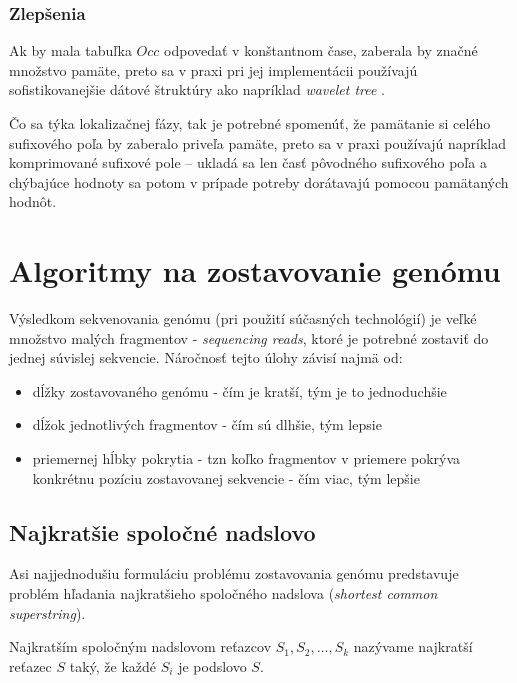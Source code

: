     \subsubsection{Zlepšenia}
    Ak by mala tabuľka $Occ$ odpovedať v konštantnom čase, zaberala by značné množstvo pamäte, preto sa v praxi pri jej implementácii používajú sofistikovanejšie dátové štruktúry ako napríklad \emph{wavelet tree} \cite{GGV03}.
    
    Čo sa týka lokalizačnej fázy, tak je potrebné spomenúť, že pamätanie si celého sufixového poľa by zaberalo priveľa pamäte, preto sa v praxi používajú napríklad komprimované sufixové pole -- ukladá sa len časť pôvodného sufixového poľa a chýbajúce hodnoty sa potom v prípade potreby dorátavajú pomocou pamätaných hodnôt.
    
    
\section{Algoritmy na zostavovanie genómu}
    Výsledkom sekvenovania genómu (pri použití súčasných technológií) je veľké
    množstvo malých fragmentov - \emph{sequencing reads}, ktoré je potrebné
    zostaviť do jednej súvislej sekvencie. Náročnosť tejto úlohy závisí najmä
    od:
    
    \begin{itemize}
        \item dĺžky zostavovaného genómu - čím je kratší, tým je to jednoduchšie
        \item dĺžok jednotlivých fragmentov - čím sú dlhšie, tým lepsie
        \item priemernej hĺbky pokrytia - tzn koľko fragmentov v priemere
        pokrýva konkrétnu pozíciu zostavovanej sekvencie - čím viac, tým lepšie
    \end{itemize}

    \subsection{Najkratšie spoločné nadslovo}
    Asi najjednodušiu formuláciu problému zostavovania genómu predstavuje
    problém hľadania najkratšieho spoločného nadslova (\emph{shortest common
    superstring}).
    
    \begin{defn}
        Najkratším spoločným nadslovom reťazcov $S_1, S_2, \ldots, S_k$ nazývame
        najkratší reťazec $S$ taký, že každé $S_i$ je podslovo $S$.
    \end{defn}
    
